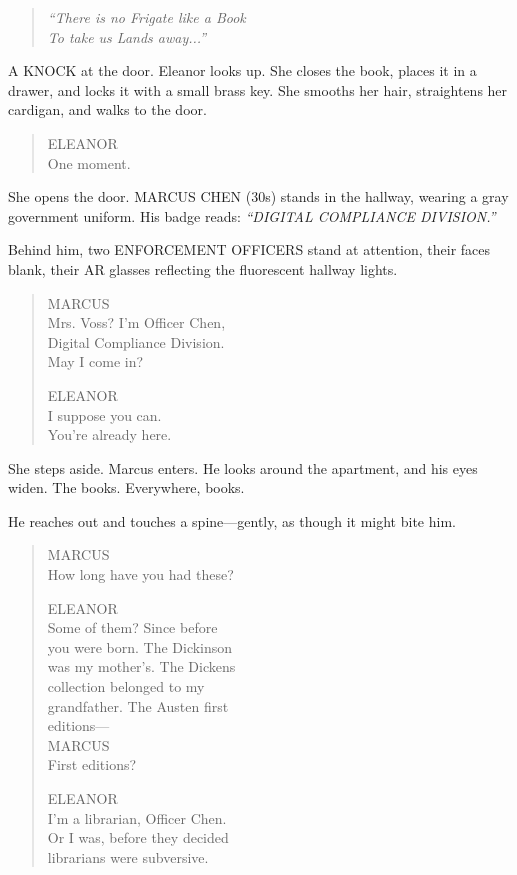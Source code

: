 \documentclass[
    language=english,
    doctype=screenplay,
    institution=none,
]{../../omnilatex}
\begin{document}
\begin{quote}
\textit{``There is no Frigate like a Book\\
To take us Lands away...''}
\end{quote}

A KNOCK at the door. Eleanor looks up. She closes the book, places it in a drawer, and locks it with a small brass key. She smooths her hair, straightens her cardigan, and walks to the door.

\begin{quote}
ELEANOR\\
One moment.
\end{quote}

She opens the door. MARCUS CHEN (30s) stands in the hallway, wearing a gray government uniform. His badge reads: \textit{``DIGITAL COMPLIANCE DIVISION.''}

Behind him, two ENFORCEMENT OFFICERS stand at attention, their faces blank, their AR glasses reflecting the fluorescent hallway lights.

\begin{quote}
MARCUS\\
Mrs. Voss? I'm Officer Chen,\\
Digital Compliance Division.\\
May I come in?

ELEANOR\\
I suppose you can.\\
You're already here.
\end{quote}

She steps aside. Marcus enters. He looks around the apartment, and his eyes widen. The books. Everywhere, books.

He reaches out and touches a spine---gently, as though it might bite him.

\begin{quote}
MARCUS\\
How long have you had these?

ELEANOR\\
Some of them? Since before\\
you were born. The Dickinson\\
was my mother's. The Dickens\\
collection belonged to my\\
grandfather. The Austen first\\
editions---\\

MARCUS\\
First editions?

ELEANOR\\
I'm a librarian, Officer Chen.\\
Or I was, before they decided\\
librarians were subversive.
\end{quote}
\end{document}
